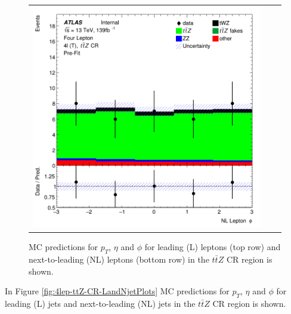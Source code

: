 \begin{figure}[htbp]
\begin{tabular}{ccc}
    \includegraphics[width=.3\textwidth]{figures/PreFitPlots/lep4_ttZ_4T_NL_lepton_phi.png} \\

  \end{tabular}
    \caption{MC predictions for $p_{T}$, $\eta$ and $\phi$ for leading (L) leptons (top row) and next-to-leading (NL) leptons (bottom row) in the $t\bar{t}Z$ CR region  is shown.}
  \label{fig:4lep-ttZ-CR-leptonPlots}
\end{figure}

In Figure \ref{fig:4lep-ttZ-CR-LandNjetPlots} MC predictions for $p_{T}$, $\eta$ and $\phi$ for leading (L) jets and next-to-leading (NL) jets in the $t\bar{t}Z$ CR region is shown.

